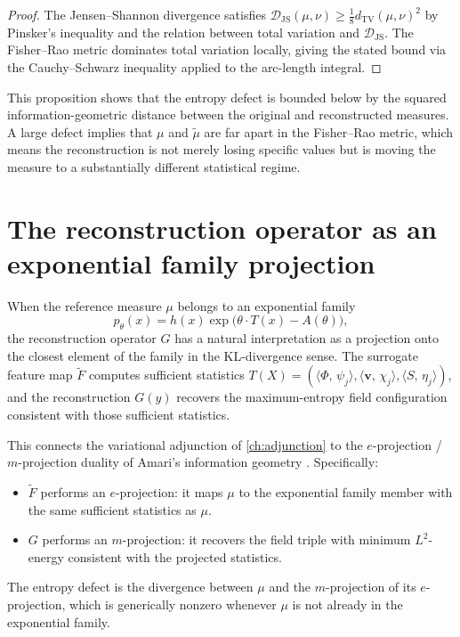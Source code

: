 \documentclass[12pt, oneside]{memoir}
\newcommand{\Ft}{\widetilde{F}}
\newcommand{\Djs}{\mathcal{D}_{\mathrm{JS}}}
\newcommand{\ip}[2]{\langle #1,\, #2 \rangle}
\newcommand{\bv}{\mathbf{v}}
\begin{document}
\begin{proof}
The Jensen--Shannon divergence satisfies $\Djs(\mu, \nu) \ge \tfrac{1}{8}
d_{\mathrm{TV}}(\mu,\nu)^2$ by Pinsker's inequality and the relation between total
variation and $\Djs$.  The Fisher--Rao metric dominates total variation locally, giving
the stated bound via the Cauchy--Schwarz inequality applied to the arc-length integral.
\end{proof}

\begin{remark}
This proposition shows that the entropy defect is bounded below by the squared
information-geometric distance between the original and reconstructed measures.  A large
defect implies that $\mu$ and $\tilde\mu$ are far apart in the Fisher--Rao metric, which
means the reconstruction is not merely losing specific values but is moving the measure
to a substantially different statistical regime.
\end{remark}

\section{The reconstruction operator as an exponential family projection}

When the reference measure $\mu$ belongs to an exponential family
\begin{equation}
  p_\theta(x) = h(x) \exp\bigl(\theta \cdot T(x) - A(\theta)\bigr),
\end{equation}
the reconstruction operator $G$ has a natural interpretation as a projection onto the
closest element of the family in the KL-divergence sense.  The surrogate feature map
$\Ft$ computes sufficient statistics $T(X) = (\ip{\Phi}{\psi_j}, \ip{\bv}{\chi_j},
\ip{S}{\eta_j})$, and the reconstruction $G(y)$ recovers the maximum-entropy field
configuration consistent with those sufficient statistics.

This connects the variational adjunction of \cref{ch:adjunction} to the
$e$-projection / $m$-projection duality of Amari's information geometry
\cite{amari2000}.  Specifically:
\begin{itemize}
  \item $\Ft$ performs an $e$-projection: it maps $\mu$ to the exponential family member
        with the same sufficient statistics as $\mu$.
  \item $G$ performs an $m$-projection: it recovers the field triple with minimum
        $L^2$-energy consistent with the projected statistics.
\end{itemize}
The entropy defect is the divergence between $\mu$ and the $m$-projection of its
$e$-projection, which is generically nonzero whenever $\mu$ is not already in the
exponential family.
\end{document}
